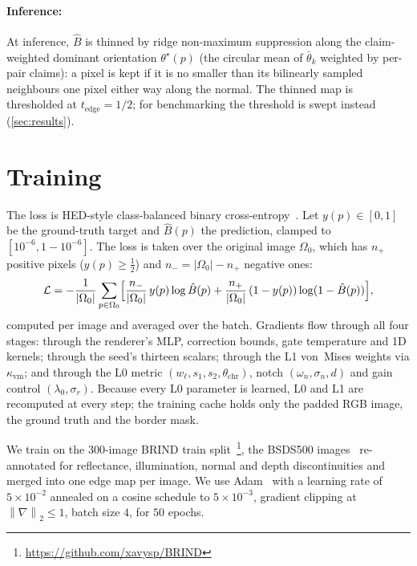\documentclass[11pt,a4paper]{article}
\newcommand{\norm}[1]{\left\lVert#1\right\rVert}
\newcommand{\abs}[1]{\left\lvert#1\right\rvert}
\begin{document}
\paragraph{Inference:}
At inference, $\hat B$ is thinned by ridge non-maximum suppression along the claim-weighted dominant orientation $\theta^\star(p)$ (the circular mean of $\bar\theta_k$ weighted by per-pair claims): a pixel is kept if it is no smaller than its bilinearly sampled neighbours one pixel either way along the normal. The thinned map is thresholded at $t_{\mathrm{edge}} = 1/2$; for benchmarking the threshold is swept instead (\cref{sec:results}).

\section{Training}\label{sec:train}

The loss is HED-style class-balanced binary cross-entropy~\cite{xie2015hed}. Let $y(p) \in [0, 1]$ be the ground-truth target and $\hat B(p)$ the prediction, clamped to $[10^{-6}, 1 - 10^{-6}]$. The loss is taken over the original image $\Omega_0$, which has $n_+$ positive pixels ($y(p) \geq \tfrac{1}{2}$) and $n_- = \abs{\Omega_0} - n_+$ negative ones:
\begin{equation}\label{eq:loss}
  \mathcal{L} = -\frac{1}{\abs{\Omega_0}}\sum_{p \in \Omega_0}\Bigl[\frac{n_-}{\abs{\Omega_0}}\, y(p)\log\hat B(p) + \frac{n_+}{\abs{\Omega_0}}\,(1 - y(p))\log(1 - \hat B(p))\Bigr],
\end{equation}
computed per image and averaged over the batch.
Gradients flow through all four stages: through the renderer's MLP, correction bounds, gate temperature and 1D kernels; through the seed's thirteen scalars; through the L1 von~Mises weights via $\kappa_{\mathrm{vm}}$; and through the L0 metric $(w_\ell, s_1, s_2, \theta_{\mathrm{chr}})$, notch $(\omega_n, \sigma_n, d)$ and gain control $(\lambda_0, \sigma_r)$. Because every L0 parameter is learned, L0 and L1 are recomputed at every step; the training cache holds only the padded RGB image, the ground truth and the border mask.

We train on the 300-image BRIND train split~\cite{pu2021rindnet}\footnote{\url{https://github.com/xavysp/BRIND}}, the BSDS500 images~\cite{arbelaez2011gpb} re-annotated for reflectance, illumination, normal and depth discontinuities and merged into one edge map per image. We use Adam~\cite{kingma2014adam} with a learning rate of $5\times 10^{-2}$ annealed on a cosine schedule to $5\times 10^{-3}$, gradient clipping at $\norm{\nabla}_2 \leq 1$, batch size $4$, for $50$ epochs.
\end{document}

